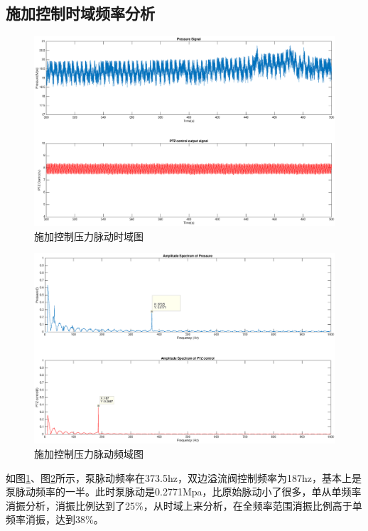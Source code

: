 \documentclass[12pt]{article}
\begin{document}
\subsection{施加控制时域频率分析}

\begin{figure}[H]
\begin{center}
\includegraphics[width=0.9\linewidth]{./images/time_domain_result_controling.eps}
\caption{施加控制压力脉动时域图}
\label{fig:fig10}
\end{center}
\end{figure}

\begin{figure}[H]
\begin{center}
\includegraphics[width=0.9\linewidth]{./images/fft_result_controling.eps}
\caption{施加控制压力脉动频域图}
\label{fig:fig11}
\end{center}
\end{figure}

如图\ref{fig:fig10}、图\ref{fig:fig11}所示，泵脉动频率在373.5hz，双边溢流阀控制频率为187hz，基本上是泵脉动频率的一半。此时泵脉动是0.2771Mpa，比原始脉动小了很多，单从单频率消振分析，消振比例达到了25\%，从时域上来分析，在全频率范围消振比例高于单频率消振，达到38\%。
\end{document}
